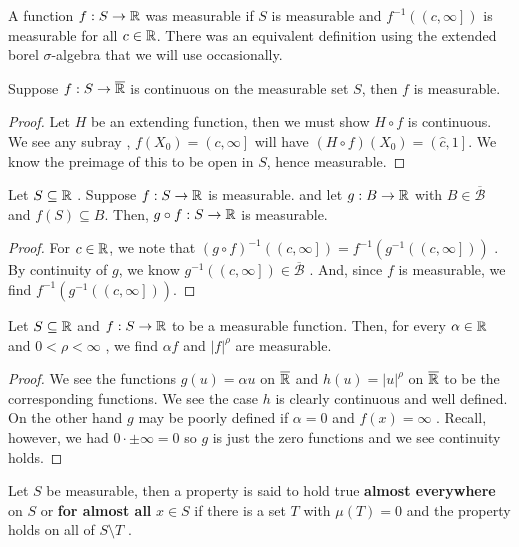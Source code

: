 \begin{recall}
	A function \(f: S \to \mathbb{R}\) was measurable if \(S\) is measurable and \(f^{-1}\left( \left( c, \infty \right]  \right) \) is measurable for all \(c \in \mathbb{R}\). There was an equivalent definition using the extended borel \(\sigma\)-algebra that we will use occasionally.
\end{recall}
\begin{proposition}
	Suppose \(f: S \to \overline{\mathbb{R}}\) is continuous on the measurable set \(S\), then \(f\) is measurable.
\end{proposition}
\begin{proof}
	Let \(H\) be an extending function, then we must show \(H \circ f\) is continuous. We see any subray , \(f\left( X_0 \right) = \left( c , \infty \right] \) will have \((H \circ f)\left( X_0 \right) = \left( \hat{c}, 1 \right] \). We know the preimage of this to be open in \(S\), hence measurable.
\end{proof}
\begin{proposition}
	Let \(S \subseteq \mathbb{R}\)	. Suppose \(f: S \to \mathbb{R}\) is measurable. and let \(g: B \to \mathbb{R}\) with \(B \in \overline{\mathscr{B}}\)  and \(f\left( S \right) \subseteq B\). Then, \(g \circ f: S \to \mathbb{R}\) is measurable.
\end{proposition}
\begin{proof}
	For \(c \in \mathbb{R}\), we note that \(\left( g \circ f \right) ^{-1} \left( \left( c, \infty \right]  \right)  = f^{-1}\left( g^{-1}\left( \left( c, \infty \right]  \right)  \right) \) . By continuity of \(g\), we know \(g^{-1}\left( \left( c, \infty \right]  \right) \in \overline{\mathscr{B}}\) . And, since \(f\) is measurable, we find \(f^{-1}\left( g^{-1}\left( \left( c, \infty \right]  \right)  \right) \).
\end{proof}
\begin{corollary}[]
Let \(S \subseteq \mathbb{R}\)	 and \(f: S \to \mathbb{R}\)	to be a measurable function. Then, for every \(\alpha \in \mathbb{R}\)	and \(0 < \rho < \infty\)	, we find \(\alpha f\)	 and \(\left| f \right| ^{\rho}\)	 are measurable.
\end{corollary}
\begin{proof}
	We see the functions \(g\left( u \right) = \alpha u\)	on \(\overline{\mathbb{R}}\)	and \(h\left( u \right)  = \left| u \right| ^{\rho}\)	 on \(\overline{\mathbb{R}}\)	 to be the corresponding functions. We see the case \(h\)	is clearly continuous and well defined. On the other hand \(g\)	may be poorly defined if \(\alpha = 0\)	 and \(f\left( x \right)  = \infty\)	. Recall, however, we had \(0 \cdot  \pm \infty = 0\)	so \(g\)	 is just the zero functions and we see continuity holds.
\end{proof}
\begin{definition}
	Let \(S\)	 be measurable, then a property is  said to hold true \textbf{almost everywhere} on \(S\)	 or \textbf{for almost all}	 \(x \in S\)	if there is a set \(T\)	 with \(\mu\left( T \right) = 0\)	 and the property holds on all of \(S \setminus T\)	.
\end{definition}

